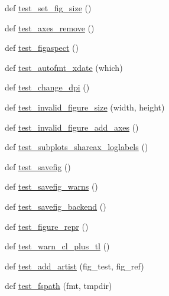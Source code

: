 \begin{DoxyCompactItemize}
\item 
def \hyperlink{namespacematplotlib_1_1tests_1_1test__figure_ad2c8d84d76ecc22ae28fd837b3ee9827}{test\+\_\+set\+\_\+fig\+\_\+size} ()
\item 
def \hyperlink{namespacematplotlib_1_1tests_1_1test__figure_a294bf1c96ed0071541e3fe58e42085e4}{test\+\_\+axes\+\_\+remove} ()
\item 
def \hyperlink{namespacematplotlib_1_1tests_1_1test__figure_a11c6073924b5562d6613868846b602d6}{test\+\_\+figaspect} ()
\item 
def \hyperlink{namespacematplotlib_1_1tests_1_1test__figure_a444201aa0b3220a1995d167d88cd2202}{test\+\_\+autofmt\+\_\+xdate} (which)
\item 
def \hyperlink{namespacematplotlib_1_1tests_1_1test__figure_ab45a4b1f47a06efb4cf08550a84e2d3d}{test\+\_\+change\+\_\+dpi} ()
\item 
def \hyperlink{namespacematplotlib_1_1tests_1_1test__figure_ac9d03f41285b999815edb59bf5ed9792}{test\+\_\+invalid\+\_\+figure\+\_\+size} (width, height)
\item 
def \hyperlink{namespacematplotlib_1_1tests_1_1test__figure_a9ed9a04dd135cf66aaf0d6c556b99cac}{test\+\_\+invalid\+\_\+figure\+\_\+add\+\_\+axes} ()
\item 
def \hyperlink{namespacematplotlib_1_1tests_1_1test__figure_a360116a17cd1b44f50b8a729252d1e4d}{test\+\_\+subplots\+\_\+shareax\+\_\+loglabels} ()
\item 
def \hyperlink{namespacematplotlib_1_1tests_1_1test__figure_a35b44827e6bd6d1d77aa4808e773cc51}{test\+\_\+savefig} ()
\item 
def \hyperlink{namespacematplotlib_1_1tests_1_1test__figure_a58c7626d65b66897783f5162a28d0b74}{test\+\_\+savefig\+\_\+warns} ()
\item 
def \hyperlink{namespacematplotlib_1_1tests_1_1test__figure_ab0d770cf3d85964adec7e5f0b6491333}{test\+\_\+savefig\+\_\+backend} ()
\item 
def \hyperlink{namespacematplotlib_1_1tests_1_1test__figure_aef706b5b0a73923cfa56a48bd337dcb1}{test\+\_\+figure\+\_\+repr} ()
\item 
def \hyperlink{namespacematplotlib_1_1tests_1_1test__figure_ac22bbf2e7308194f77af1a4b744d826b}{test\+\_\+warn\+\_\+cl\+\_\+plus\+\_\+tl} ()
\item 
def \hyperlink{namespacematplotlib_1_1tests_1_1test__figure_a205afd7ef4436d7fa100b1db41d8a5e6}{test\+\_\+add\+\_\+artist} (fig\+\_\+test, fig\+\_\+ref)
\item 
def \hyperlink{namespacematplotlib_1_1tests_1_1test__figure_aeb6d9f576504b02c3703b9262c16a934}{test\+\_\+fspath} (fmt, tmpdir)

\end{DoxyCompactItemize}
